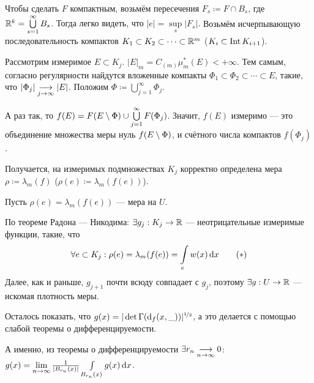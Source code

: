 \documentclass[a4paper]{report}
\begin{document}
{{{{{                    Чтобы сделать $F$ компактным, возьмём пересечения $F_s \coloneqq F \cap B_s$, где $\mathbb{R}^k = \bigcup\limits_{s = 1}^{\infty}B_s$.
                    Тогда легко видеть, что $|e| = \sup\limits_{s}|F_s|$.
                }
            }
        }
        Возьмём исчерпывающую последовательность компактов $K_1 \subset K_2 \subset \cdots \subset \mathbb{R}^m$ ($K_i \subset \operatorname{Int} K_{i+1}$).

        Рассмотрим измеримое $E \subset K_j$. $|E|_m = C_{(m)}\mu_m^*(E) < +\infty$.
        Тем самым, согласно регулярности найдутся вложенные компакты $\Phi_1 \subset \Phi_2 \subset \cdots \subset E$, такие, что $|\Phi_j| \underset{j \to \infty}{\longrightarrow} |E|$.
        Положим $\Phi \coloneqq \bigcup\limits_{j = 1}^{\infty}\Phi_j$.

        А раз так, то $f(E) = F(E \setminus \Phi) \cup \bigcup\limits_{j = 1}^{\infty}F(\Phi_j)$.
        Значит, $f(E)$ измеримо --- это объединение множества меры нуль $f(E \setminus \Phi)$, и счётного числа компактов $f(\Phi_j)$.

        Получается, на измеримых подмножествах $K_j$ корректно определена мера $\rho \coloneqq \lambda_m(f)$ ($\rho(e) \coloneqq \lambda_m(f(e))$).

        \item Пусть $\rho(e) = \lambda_m(f(e))$ --- мера на $U$.

        По теореме Радона --- Никодима: $\exists g_j: K_j \rightarrow \mathbb{R}$ --- неотрицательные измеримые функции, такие, что
        \[\forall e \subset K_j: \rho(e) = \lambda_m(f(e)) = \int\limits_{e}w(x)\operatorname{d}\! x\label{density}\tag{$*$}\]
        Далее, как и раньше, $g_{j + 1}$ почти всюду совпадает с $g_j$, поэтому $\exists g: U \rightarrow \mathbb{R}$ --- искомая плотность меры.

        \item Осталось показать, что $g(x) = |\det \Gamma(\operatorname{d}\!_f(x, \_))|^{\nicefrac12}$, а это делается с помощью слабой теоремы о дифференцируемости.

        А именно, из теоремы о дифференцируемости $\exists r_n \underset{n \to \infty}{\longrightarrow} 0$: $g(x) = \lim\limits_{n \to \infty}\frac{1}{|B_{r_n}(x)|}\int\limits_{B_{r_n}(x)}g(x) \operatorname{d}\! x$.

}}
\end{document}
